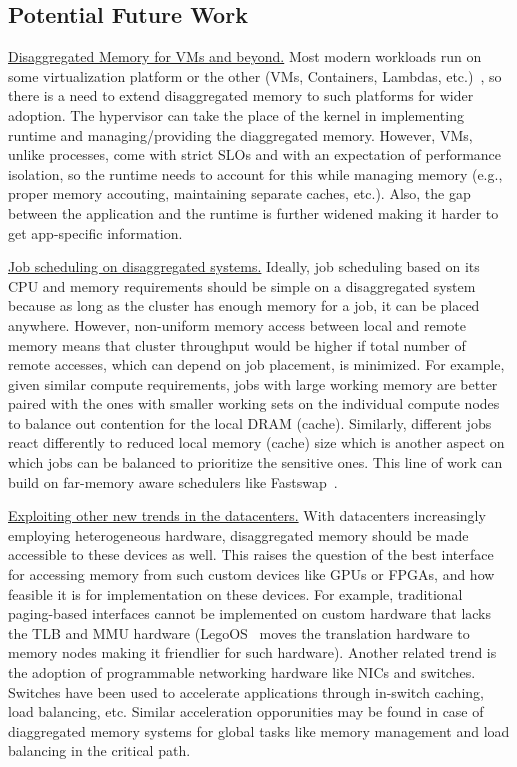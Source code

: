 \subsection{Potential Future Work}
\vspace{3pt}
\noindent \uline{Disaggregated Memory for VMs and beyond.}
Most modern workloads run on some virtualization platform 
or the other (VMs, Containers, Lambdas, etc.)~\cite{Aguilera2017}, 
so there is a need to extend disaggregated memory to such 
platforms for wider adoption. The hypervisor can take the place 
of the kernel in implementing runtime and managing/providing 
the diaggregated memory. However, VMs, unlike processes, come 
with strict SLOs and with an expectation of performance isolation,
so the runtime needs to account for this while managing memory 
(e.g., proper memory accouting, maintaining separate caches, etc.). 
Also, the gap between the application and the runtime is further 
widened making it harder to get app-specific information.

\vspace{3pt}
\noindent \uline{Job scheduling on disaggregated systems.}
Ideally, job scheduling based on its CPU and memory requirements 
should be simple on a disaggregated system because as long 
as the cluster has enough memory for a job, it can be placed  
anywhere. However, non-uniform memory access between local 
and remote memory means that cluster throughput would be 
higher if total number of remote accesses, which can depend
on job placement, is minimized. For example, given similar 
compute requirements, jobs with large working memory are   
better paired with the ones with smaller working sets on the 
individual compute nodes to balance out contention for the 
local DRAM (cache). Similarly, different jobs react differently 
to reduced local memory (cache) size which is another aspect on 
which jobs can be balanced to prioritize the sensitive ones.
This line of work can build on far-memory aware schedulers 
like Fastswap~\cite{fastswap}.

\vspace{3pt}
\noindent \uline{Exploiting other new trends 
in the datacenters.}
With datacenters increasingly employing heterogeneous 
hardware, disaggregated memory should be made accessible 
to these devices as well. This raises the question of 
the best interface for accessing memory from such  
custom devices like GPUs or FPGAs, and how feasible it is  
for implementation on these devices. For example, 
traditional paging-based interfaces cannot be 
implemented on custom hardware that lacks the TLB and MMU 
hardware (LegoOS~\cite{legoos} moves the translation hardware 
to memory nodes making it friendlier for such hardware). 
Another related trend is the 
adoption of programmable networking hardware like 
NICs and switches. Switches have been used to 
accelerate applications through in-switch caching, load
balancing, etc. Similar acceleration opporunities may be found 
in case of diaggregated memory systems for global tasks like 
memory management and load balancing in the critical path.

